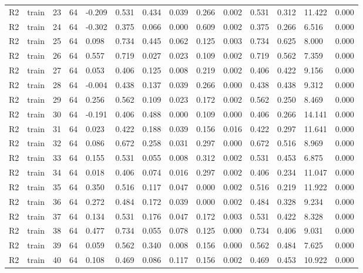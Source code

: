\begin{table}[t]
\begin{tabular}{llllllllllllll}
R2 & train & 23 & 64 & -0.209 & 0.531 & 0.434 & 0.039 & 0.266 & 0.002 & 0.531 & 0.312 & 11.422 & 0.000 \\
R2 & train & 24 & 64 & -0.302 & 0.375 & 0.066 & 0.000 & 0.609 & 0.002 & 0.375 & 0.266 & 6.516 & 0.000 \\
R2 & train & 25 & 64 & 0.098 & 0.734 & 0.445 & 0.062 & 0.125 & 0.003 & 0.734 & 0.625 & 8.000 & 0.000 \\
R2 & train & 26 & 64 & 0.557 & 0.719 & 0.027 & 0.023 & 0.109 & 0.002 & 0.719 & 0.562 & 7.359 & 0.000 \\
R2 & train & 27 & 64 & 0.053 & 0.406 & 0.125 & 0.008 & 0.219 & 0.002 & 0.406 & 0.422 & 9.156 & 0.000 \\
R2 & train & 28 & 64 & -0.004 & 0.438 & 0.137 & 0.039 & 0.266 & 0.000 & 0.438 & 0.438 & 9.312 & 0.000 \\
R2 & train & 29 & 64 & 0.256 & 0.562 & 0.109 & 0.023 & 0.172 & 0.002 & 0.562 & 0.250 & 8.469 & 0.000 \\
R2 & train & 30 & 64 & -0.191 & 0.406 & 0.488 & 0.000 & 0.109 & 0.000 & 0.406 & 0.266 & 14.141 & 0.000 \\
R2 & train & 31 & 64 & 0.023 & 0.422 & 0.188 & 0.039 & 0.156 & 0.016 & 0.422 & 0.297 & 11.641 & 0.000 \\
R2 & train & 32 & 64 & 0.086 & 0.672 & 0.258 & 0.031 & 0.297 & 0.000 & 0.672 & 0.516 & 8.969 & 0.000 \\
R2 & train & 33 & 64 & 0.155 & 0.531 & 0.055 & 0.008 & 0.312 & 0.002 & 0.531 & 0.453 & 6.875 & 0.000 \\
R2 & train & 34 & 64 & 0.018 & 0.406 & 0.074 & 0.016 & 0.297 & 0.002 & 0.406 & 0.234 & 11.047 & 0.000 \\
R2 & train & 35 & 64 & 0.350 & 0.516 & 0.117 & 0.047 & 0.000 & 0.002 & 0.516 & 0.219 & 11.922 & 0.000 \\
R2 & train & 36 & 64 & 0.272 & 0.484 & 0.172 & 0.039 & 0.000 & 0.002 & 0.484 & 0.328 & 9.234 & 0.000 \\
R2 & train & 37 & 64 & 0.134 & 0.531 & 0.176 & 0.047 & 0.172 & 0.003 & 0.531 & 0.422 & 8.328 & 0.000 \\
R2 & train & 38 & 64 & 0.477 & 0.734 & 0.055 & 0.078 & 0.125 & 0.000 & 0.734 & 0.406 & 9.031 & 0.000 \\
R2 & train & 39 & 64 & 0.059 & 0.562 & 0.340 & 0.008 & 0.156 & 0.000 & 0.562 & 0.484 & 7.625 & 0.000 \\
R2 & train & 40 & 64 & 0.108 & 0.469 & 0.086 & 0.117 & 0.156 & 0.002 & 0.469 & 0.453 & 10.922 & 0.000 \\

\end{tabular}
\end{table}

